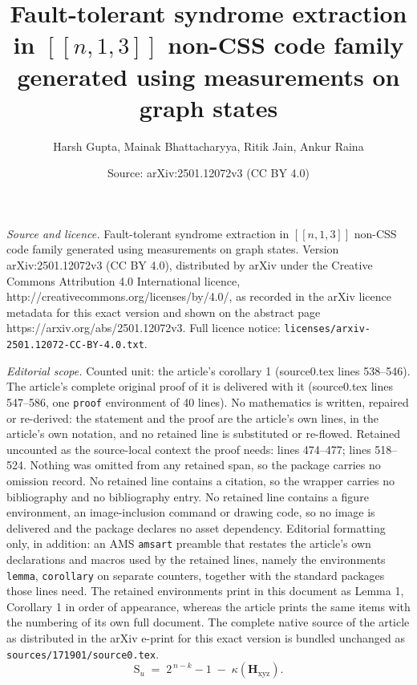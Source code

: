 \documentclass[10pt,a4paper]{amsart}
\title{Fault-tolerant syndrome extraction in \texorpdfstring{$[[n,1,3]]$}{[[n,1,3]]} non-CSS code family generated using measurements on graph states}
\author{Harsh Gupta, Mainak Bhattacharyya, Ritik Jain, Ankur Raina}
\date{Source: arXiv:2501.12072v3 (CC BY 4.0)}
\begin{document}
\maketitle

\noindent\emph{Source and licence.} Fault-tolerant syndrome extraction in \texorpdfstring{$[[n,1,3]]$}{[[n,1,3]]} non-CSS code family generated using measurements on graph states. Version arXiv:2501.12072v3 (CC BY 4.0), distributed by arXiv under the Creative Commons Attribution 4.0 International licence, http://creativecommons.org/licenses/by/4.0/, as recorded in the arXiv licence metadata for this exact version and shown on the abstract page https://arxiv.org/abs/2501.12072v3. Full licence notice: \texttt{licenses/arxiv-2501.12072-CC-BY-4.0.txt}.\par\smallskip

\noindent\textit{Editorial scope.} Counted unit: the article's corollary 1 (source0.tex lines 538--546). The article's complete original proof of it is delivered with it (source0.tex lines 547--586, one \texttt{proof} environment of 40 lines). No mathematics is written, repaired or re-derived: the statement and the proof are the article's own lines, in the article's own notation, and no retained line is substituted or re-flowed.  Retained uncounted as the source-local context the proof needs: lines 474--477; lines 518--524.  Nothing was omitted from any retained span, so the package carries no omission record.  No retained line contains a citation, so the wrapper carries no bibliography and no bibliography entry.  No retained line contains a figure environment, an image-inclusion command or drawing code, so no image is delivered and the package declares no asset dependency.  Editorial formatting only, in addition: an AMS \texttt{amsart} preamble that restates the article's own declarations and macros used by the retained lines, namely the environments \texttt{lemma}, \texttt{corollary} on separate counters, together with the standard packages those lines need.  The retained environments print in this document as Lemma 1, Corollary 1 in order of appearance, whereas the article prints the same items with the numbering of its own full document.  The complete native source of the article as distributed in the arXiv e-print for this exact version is bundled unchanged as \texttt{sources/171901/source0.tex}.
\begin{equation}
 \mathrm{S}_u \;=\; 2^{\,n-k}-1 \;-\; \kappa(\mathbf{H}_{\mathrm{xyz}}).
 \label{eq:unique_syndrome}
\end{equation}
\end{document}
